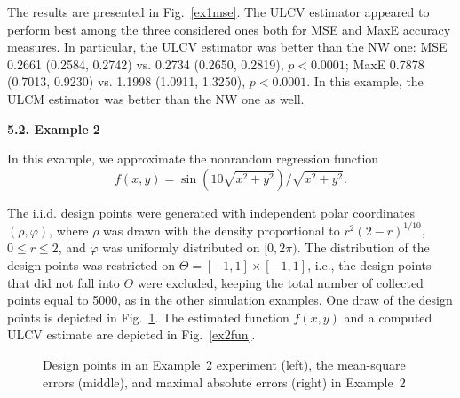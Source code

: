 \documentclass[12pt]{article}
\theoremstyle{remark}
\begin{document}

The results are presented in Fig.~\ref{ex1mse}. The ULCV estimator appeared to perform best among the three considered ones both for MSE and MaxE accuracy measures. In particular, the ULCV estimator was better than the NW one: MSE 0.2661 (0.2584,  0.2742) vs. 0.2734 (0.2650, 0.2819), $p<0.0001$; MaxE 0.7878 (0.7013,  0.9230) vs. 1.1998 (1.0911, 1.3250), $p<0.0001$.
In this example, the ULCM estimator was better than the NW one as well.



\bigskip


\noindent\textbf{5.2. Example 2}


In this example, we approximate the nonrandom regression function
\begin{equation}\label{funex2}
f(x,y)=\sin\left(10 \sqrt{x^2+y^2}\right)/\sqrt{x^2+y^2}.
\end{equation}

The i.i.d. design points were generated
with independent polar coordinates $(\rho,\varphi)$, where $\rho$ was drawn with the density proportional
to $r^2(2-r)^{1/10}$, $0\le r \le 2$, and $\varphi$ was uniformly distributed on $[0,2\pi)$. The distribution of the design points was restricted on
$\Theta = [-1,1]\times [-1,1]$, i.e., the design points that did not fall into $\Theta$ were excluded, keeping the total number of collected points equal to 5000, as in the other simulation examples.
One draw of the design points is depicted in Fig.~\ref{ex2mse}. The estimated function $f(x,y)$ and a computed ULCV estimate are depicted in Fig.~\ref{ex2fun}.

%
%
%
\begin{figure}[!h]
    \centering
    \vspace{-12pt}
    \caption{Design points in an Example~2 experiment (left), the mean-square errors (middle), and maximal absolute errors (right) in Example~2}\label{ex2mse}
\end{figure}
\end{document}

